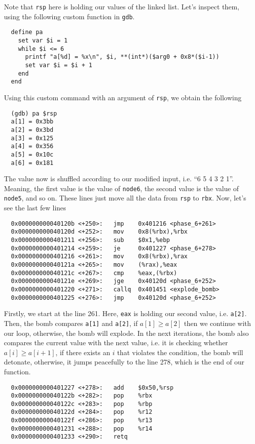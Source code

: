 Note that \verb|rsp| here is holding our values of the linked list. Let's inspect them, using the following custom function in \verb|gdb|.
{\renewcommand\fcolorbox[4][]{\textcolor{black}{\strut#4}}
\begin{verbatim}
  define pa
    set var $i = 1
    while $i <= 6
      printf "a[%d] = %x\n", $i, **(int*)($arg0 + 0x8*($i-1))
      set var $i = $i + 1
    end
  end
\end{verbatim}
}\noindent
Using this custom command with an argument of \verb|rsp|, we obtain the following
{\renewcommand\fcolorbox[4][]{\textcolor{black}{\strut#4}}
\begin{verbatim}
  (gdb) pa $rsp
  a[1] = 0x3bb
  a[2] = 0x3bd
  a[3] = 0x125
  a[4] = 0x356
  a[5] = 0x10c
  a[6] = 0x181
\end{verbatim}
}\noindent
The value now is shuffled according to our modified input, i.e. ``6 5 4 3 2 1''. Meaning, the first value is the value of \verb|node6|, the second value is the value of \verb|node5|, and so on. These lines just move all the data from \verb|rsp| to \verb|rbx|. Now, let's see the last few lines
{\renewcommand\fcolorbox[4][]{\textcolor{cyan}{\strut#4}}
\begin{verbatim}
  0x000000000040120b <+250>:   jmp    0x401216 <phase_6+261>
  0x000000000040120d <+252>:   mov    0x8(%rbx),%rbx
  0x0000000000401211 <+256>:   sub    $0x1,%ebp
  0x0000000000401214 <+259>:   je     0x401227 <phase_6+278>
  0x0000000000401216 <+261>:   mov    0x8(%rbx),%rax
  0x000000000040121a <+265>:   mov    (%rax),%eax
  0x000000000040121c <+267>:   cmp    %eax,(%rbx)
  0x000000000040121e <+269>:   jge    0x40120d <phase_6+252>
  0x0000000000401220 <+271>:   callq  0x401451 <explode_bomb>
  0x0000000000401225 <+276>:   jmp    0x40120d <phase_6+252>
\end{verbatim}
}\noindent
Firstly, we start at the line 261. Here, \verb|eax| is holding our second value, i.e. \verb|a[2]|. Then, the bomb compares \verb|a[1]| and \verb|a[2]|, if $a[1] \geq a[2]$ then we continue with our loop, otherwise, the bomb will explode. In the next iterations, the bomb also compares the current value with the next value, i.e. it is checking whether $a[i] \geq a[i + 1]$, if there exists an $i$ that violates the condition, the bomb will detonate, otherwise, it jumps peacefully to the line 278, which is the end of our function.
{\renewcommand\fcolorbox[4][]{\textcolor{cyan}{\strut#4}}
\begin{verbatim}
  0x0000000000401227 <+278>:   add    $0x50,%rsp
  0x000000000040122b <+282>:   pop    %rbx
  0x000000000040122c <+283>:   pop    %rbp
  0x000000000040122d <+284>:   pop    %r12
  0x000000000040122f <+286>:   pop    %r13
  0x0000000000401231 <+288>:   pop    %r14
  0x0000000000401233 <+290>:   retq
\end{verbatim}
}\noindent
